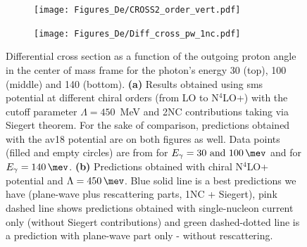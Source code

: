     \begin{figure}[h]
        \centering
        \begin{subfigure}[t]{0.46\textwidth}
            \texttt{[image: Figures\_De/CROSS2\_order\_vert.pdf]}
            \caption{}
            \label{Diff_cross_order}
        \end{subfigure}
        \begin{subfigure}[t]{0.46\textwidth}
            \texttt{[image: Figures\_De/Diff\_cross\_pw\_1nc.pdf]}
            \caption{}
            \label{Diff_cross_pw_1nc}
        \end{subfigure}
        \caption{Differential cross section as a function of the outgoing proton angle in the center of mass frame 
        for the photon's energy \SI{30}{\mev} (top), \SI{100}{\mev} (middle) and \SI{140}{\mev} (bottom).
        {\bf (a)} Results obtained using \gls*{sms} potential
        at different chiral orders (from LO to N$^4$LO+) with the cutoff parameter $\Lambda=450$~MeV and 
        2NC contributions taking via Siegert theorem.
        For the sake of comparison, predictions obtained with the \gls*{av18} potential are on both figures as well.
        Data points (filled and empty circles) are from \cite{Ying_Experiment_Deut}
        for $E_\gamma=\SIlist[list-units = single]{30; 100}{\mev}$
        and \cite{DeSanctis_Experiment_Deut} for $E_\gamma=\SI{140}{\mev}$.
        {\bf (b)} Predictions obtained with chiral N$^4$LO+ potential and $\Lambda=\SI{450}{\mev}$.
        Blue solid line is a best predictions we have (plane-wave plus rescattering parts, 1NC + Siegert), pink dashed line shows predictions obtained with
        single-nucleon current only (without Siegert contributions) and green dashed-dotted line
        is a prediction with plane-wave part only - without rescattering.
        }
        \label{Diff_cross_order_pw}
    \end{figure}


